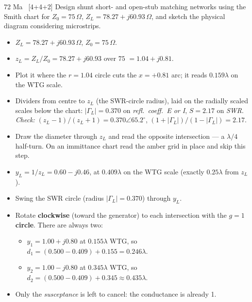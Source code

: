 \begin{asked}{72 Ma \ [4+4+2]}
Design shunt short- and open-stub matching networks using the Smith chart for $Z_0 = 75\,\Omega$, $Z_L = 78.27+j60.93\,\Omega$, and sketch the physical diagram considering microstrips.
\end{asked}
\begin{itemize}
  \item $Z_L = 78.27 + j60.93\,\Omega$, $Z_0 = 75\,\Omega$.
\end{itemize}
\begin{itemize}
  \item $z_L = Z_L/Z_0 = 78.27 + j60.93$ over $75$ $=1.04 + j0.81$.
  \item Plot it where the $r = 1.04$ circle cuts the $x = +0.81$ arc; it reads $0.159\lambda$ on the WTG scale.
  \item Dividers from centre to $z_L$ (the SWR-circle radius), laid on the radially scaled scales below the chart: $|\Gamma_L| = 0.370$ on \emph{refl.\ coeff.\ E or I}, $S = 2.17$ on \emph{SWR}. \textit{Check:} $(z_L-1)/(z_L+1) = 0.370\angle 65.2^\circ$, $(1+|\Gamma_L|)/(1-|\Gamma_L|) = 2.17$.
\end{itemize}
\begin{itemize}
  \item Draw the diameter through $z_L$ and read the opposite intersection --- a $\lambda/4$ half-turn. On an immittance chart read the amber grid in place and skip this step.
  \item $y_L = 1/z_L = 0.60 - j0.46$, at $0.409\lambda$ on the WTG scale (exactly $0.25\lambda$ from $z_L$).
\end{itemize}
\begin{itemize}
  \item Swing the SWR circle (radius $|\Gamma_L| = 0.370$) through $y_L$.
  \item Rotate \textbf{clockwise} (toward the generator) to each intersection with the \textbf{$g=1$ circle}. There are always two:
  \begin{itemize}
    \item $y_1 = 1.00 + j0.80$ at $0.155\lambda$ WTG, so $d_1 = (0.500 - 0.409) + 0.155 = 0.246\lambda$.
    \item $y_2 = 1.00 - j0.80$ at $0.345\lambda$ WTG, so $d_2 = (0.500 - 0.409) + 0.345 \approx 0.435\lambda$.
  \end{itemize}
  \item Only the \emph{susceptance} is left to cancel: the conductance is already 1.
\end{itemize}
